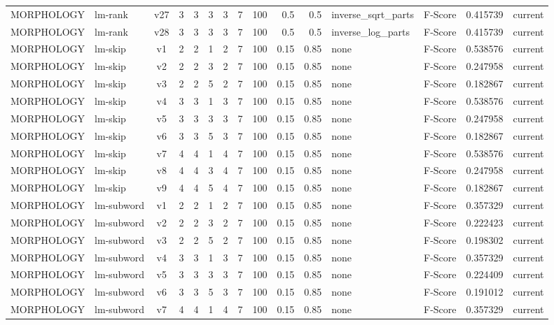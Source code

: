 \documentclass{article}
\begin{document}
\begin{xltabular}{\linewidth}{@{}lYcrrrrrrrrYlrl@{}}
MORPHOLOGY & lm-rank & v27 & 3 & 3 & 3 & 3 & 7 & 100 & 0.5 & 0.5 & inverse\_sqrt\_parts & F-Score & 0.415739 & current \\
MORPHOLOGY & lm-rank & v28 & 3 & 3 & 3 & 3 & 7 & 100 & 0.5 & 0.5 & inverse\_log\_parts & F-Score & 0.415739 & current \\
MORPHOLOGY & lm-skip & v1 & 2 & 2 & 1 & 2 & 7 & 100 & 0.15 & 0.85 & none & F-Score & 0.538576 & current \\
MORPHOLOGY & lm-skip & v2 & 2 & 2 & 3 & 2 & 7 & 100 & 0.15 & 0.85 & none & F-Score & 0.247958 & current \\
MORPHOLOGY & lm-skip & v3 & 2 & 2 & 5 & 2 & 7 & 100 & 0.15 & 0.85 & none & F-Score & 0.182867 & current \\
MORPHOLOGY & lm-skip & v4 & 3 & 3 & 1 & 3 & 7 & 100 & 0.15 & 0.85 & none & F-Score & 0.538576 & current \\
MORPHOLOGY & lm-skip & v5 & 3 & 3 & 3 & 3 & 7 & 100 & 0.15 & 0.85 & none & F-Score & 0.247958 & current \\
MORPHOLOGY & lm-skip & v6 & 3 & 3 & 5 & 3 & 7 & 100 & 0.15 & 0.85 & none & F-Score & 0.182867 & current \\
MORPHOLOGY & lm-skip & v7 & 4 & 4 & 1 & 4 & 7 & 100 & 0.15 & 0.85 & none & F-Score & 0.538576 & current \\
MORPHOLOGY & lm-skip & v8 & 4 & 4 & 3 & 4 & 7 & 100 & 0.15 & 0.85 & none & F-Score & 0.247958 & current \\
MORPHOLOGY & lm-skip & v9 & 4 & 4 & 5 & 4 & 7 & 100 & 0.15 & 0.85 & none & F-Score & 0.182867 & current \\
MORPHOLOGY & lm-subword & v1 & 2 & 2 & 1 & 2 & 7 & 100 & 0.15 & 0.85 & none & F-Score & 0.357329 & current \\
MORPHOLOGY & lm-subword & v2 & 2 & 2 & 3 & 2 & 7 & 100 & 0.15 & 0.85 & none & F-Score & 0.222423 & current \\
MORPHOLOGY & lm-subword & v3 & 2 & 2 & 5 & 2 & 7 & 100 & 0.15 & 0.85 & none & F-Score & 0.198302 & current \\
MORPHOLOGY & lm-subword & v4 & 3 & 3 & 1 & 3 & 7 & 100 & 0.15 & 0.85 & none & F-Score & 0.357329 & current \\
MORPHOLOGY & lm-subword & v5 & 3 & 3 & 3 & 3 & 7 & 100 & 0.15 & 0.85 & none & F-Score & 0.224409 & current \\
MORPHOLOGY & lm-subword & v6 & 3 & 3 & 5 & 3 & 7 & 100 & 0.15 & 0.85 & none & F-Score & 0.191012 & current \\
MORPHOLOGY & lm-subword & v7 & 4 & 4 & 1 & 4 & 7 & 100 & 0.15 & 0.85 & none & F-Score & 0.357329 & current \\

\end{xltabular}
\end{document}
